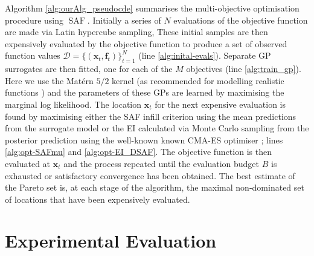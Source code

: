 \documentclass[conference]{IEEEtran}
\newcommand{\ninitialevaluations}{N}
\newcommand{\nbudget}{B}
\newcommand{\nobj}{M}
\DeclareMathOperator*{\saf}{SAF}
\newcommand\ei{EI\xspace}
\newcommand\gp{GP\xspace}
\newcommand\gps{GPs\xspace}
\newcommand{\bx}{\mathbf{x}}
\newcommand{\bff}{\mathbf{f}}
\newcommand{\data}{\mathcal{D}}
\begin{document}
Algorithm  \ref{alg:ourAlg_pseudocde} summarises the multi-objective
optimisation procedure using $\saf$.   
Initially a series of $\ninitialevaluations$ evaluations of the objective
function are made via  Latin hypercube sampling, These initial samples are
then expensively evaluated by the objective function to produce a set of
observed function values  $\data = \{(\bx_t,
\bff_t)\}_{t=1}^{\ninitialevaluations}$ (line \ref{alg:inital-evals}).
Separate \gp surrogates are then fitted, one for each of the $\nobj$
objectives (line \ref{alg:train_gp}). Here we use the Mat{\'e}rn $5/2$ kernel (as recommended for modelling realistic functions \cite{snoek2012practical}) and the parameters of these \gps are
learned by maximising the marginal log likelihood.
 The location $\bx_t$  for the next expensive
evaluation is found by maximising either the SAF infill criterion using the mean predictions from the
surrogate model or the \ei calculated via Monte Carlo sampling from the
posterior prediction using the well-known known CMA-ES optimiser
 \cite{hansen2003reducing}; lines \ref{alg:opt-SAFmu} and \ref{alg:opt-EI_DSAF}. 
  The objective function is then evaluated at
 $\mathbf{x}_t$ and the process repeated until the evaluation budget $\nbudget$ is
 exhausted or satisfactory convergence has been obtained.  The best
 estimate of the Pareto set is, at each stage of the algorithm, the maximal
 non-dominated set of locations that have been expensively evaluated.
 










\section{Experimental Evaluation}
\label{sec:exper-eval}
\end{document}
